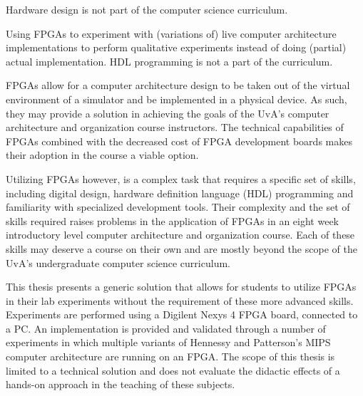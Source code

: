 \documentclass[openright]{template/uva-bachelor-thesis}
\begin{document}
Hardware design is not part of the computer science curriculum.

Using FPGAs to experiment with (variations of) live computer architecture implementations to perform qualitative experiments instead of doing (partial) actual implementation. HDL programming is not a part of the curriculum.

FPGAs allow for a computer architecture design to be taken out of the virtual environment of a simulator and be implemented in a physical device. As such, they may provide a solution in achieving the goals of the UvA's computer architecture and organization course instructors. The technical capabilities of FPGAs combined with the decreased cost of FPGA development boards makes their adoption in the course a viable option. 

Utilizing FPGAs however, is a complex task that requires a specific set of skills, including digital design, hardware definition language (HDL) programming and familiarity with specialized development tools. Their complexity and the set of skills required raises problems in the application of FPGAs in an eight week introductory level computer architecture and organization course. Each of these skills may deserve a course on their own and are mostly beyond the scope of the UvA's undergraduate computer science curriculum. 

This thesis presents a generic solution that allows for students to utilize FPGAs in their lab experiments without the requirement of these more advanced skills. Experiments are performed using a Digilent Nexys 4 FPGA board, connected to a PC. An implementation is provided and validated through a number of experiments in which multiple variants of Hennessy and Patterson's MIPS computer architecture are running on an FPGA. The scope of this thesis is limited to a technical solution and does not evaluate the didactic effects of a hands-on approach in the teaching of these subjects.

\end{document}
